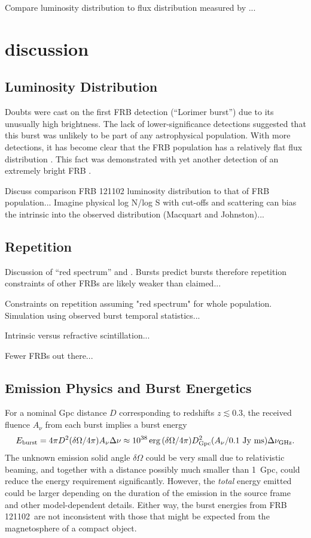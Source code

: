 \documentclass[twocolumn]{aastex61}
\newcommand{\frb}{FRB 121102}
\begin{document}
Compare luminosity distribution to flux distribution measured by \citep{2016ApJ...830...75V}...



\section{discussion}

\subsection{Luminosity Distribution}
Doubts were cast on the first FRB detection (``Lorimer burst'') due to its unusually high brightness. The lack of lower-significance detections suggested that this burst was unlikely to be part of any astrophysical population. With more detections, it has become clear that the FRB population has a relatively flat flux distribution \citep{2016ApJ...830...75V, 2016arXiv161100458L}. This fact was demonstrated with yet another detection of an extremely bright FRB \citep{2016arXiv161105758R}.

Discuss comparison FRB 121102 luminosity distribution to that of FRB population...
Imagine physical log N/log S with cut-offs and scattering can bias the intrinsic into the observed distribution (Macquart and Johnston)...


\subsection{Repetition}
Discussion of ``red spectrum'' and \citet{2016MNRAS.458L..89C}. Bursts predict bursts therefore repetition constraints of other FRBs are likely weaker than claimed...

Constraints on repetition assuming "red spectrum" for whole population. Simulation using observed burst temporal statistics...

Intrinsic versus refractive scintillation...

Fewer FRBs out there...

\subsection{Emission Physics and Burst Energetics}

For a nominal Gpc distance $D$ corresponding to redshifts $z\lesssim 0.3$, the received fluence $A_{\nu}$ from each burst implies  a burst energy
$$E_{\rm burst} = 4\pi D^2 (\delta\Omega/4\pi) A_{\nu} \Delta\nu
\approx 10^{38}\, {\rm erg}\,(\delta\Omega/4\pi) D_{\rm Gpc}^2  (A_{\nu} / 0.1\ {\rm Jy\ ms}) \Delta\nu_{\rm GHz}.$$
The unknown  emission solid angle $\delta\Omega$
could be very small due to relativistic beaming, and together with a distance possibly much smaller than 1~Gpc, could reduce the energy requirement significantly.  However, the {\it total} energy emitted could be larger depending on the duration of the emission in the source frame and other model-dependent details.
Either way, the burst energies from \frb\ are not inconsistent with those that might be expected from the magnetosphere of a compact object\cite{2016MNRAS.457..232C}.
\end{document}
